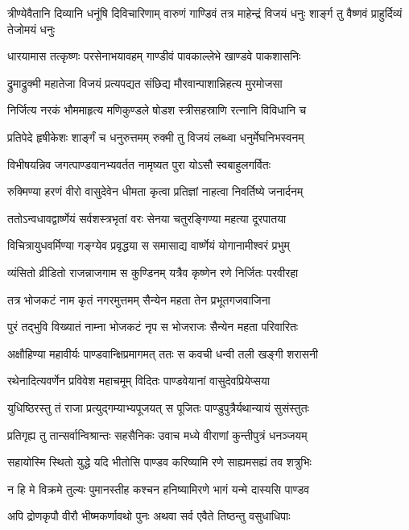 \threelineshloka
{त्रीण्येवैतानि दिव्यानि धनूंषि दिविचारिणाम्}
{वारुणं गाण्डिवं तत्र माहेन्द्रं विजयं धनुः}
{शार्ङ्ग तु वैष्णवं प्राहुर्दिव्यं तेजोमयं धनुः}


\twolineshloka
{धारयामास तत्कृष्णः परसेनाभयावहम्}
{गाण्डीवं पावकाल्लेभे खाण्डवे पाकशासनिः}


\twolineshloka
{द्रुमाद्रुक्मी महातेजा विजयं प्रत्यपद्यत}
{संछिद्य मौरवान्पाशान्निहत्य मुरमोजसा}


\twolineshloka
{निर्जित्य नरकं भौममाहृत्य मणिकुण्डले}
{षोडश स्त्रीसहस्राणि रत्नानि विविधानि च}


\twolineshloka
{प्रतिपेदे हृषीकेशः शार्ङ्गं च धनुरुत्तमम्}
{रुक्मी तु विजयं लब्ध्वा धनुर्मेघनिभस्वनम्}


\twolineshloka
{विभीषयन्निव जगत्पाण्डवानभ्यवर्तत}
{नामृष्यत पुरा योऽसौ स्वबाहुलगर्वितः}


\twolineshloka
{रुक्मिण्या हरणं वीरो वासुदेवेन धीमता}
{कृत्वा प्रतिज्ञां नाहत्वा निवर्तिष्ये जनार्दनम्}


\twolineshloka
{ततोऽन्वधावद्वार्ष्णेयं सर्वशस्त्रभृतां वरः}
{सेनया चतुरङ्गिण्या महत्या दूरपातया}


\twolineshloka
{विचित्रायुधवर्मिण्या गङ्ग्येव प्रवृद्धया}
{स समासाद्य वार्ष्णेयं योगानामीश्वरं प्रभुम्}


\twolineshloka
{व्यंसितो व्रीडितो राजन्नाजगाम स कुण्डिनम्}
{यत्रैव कृष्णेन रणे निर्जितः परवीरहा}


\twolineshloka
{तत्र भोजकटं नाम कृतं नगरमुत्तमम्}
{सैन्येन महता तेन प्रभूतगजवाजिना}


\twolineshloka
{पुरं तद्भुवि विख्यातं नाम्ना भोजकटं नृप}
{स भोजराजः सैन्येन महता परिवारितः}


\twolineshloka
{अक्षौहिण्या महावीर्यः पाण्डवान्क्षिप्रमागमत्}
{ततः स कवची धन्वी तली खङ्गी शरासनी}


\twolineshloka
{रथेनादित्यवर्णेन प्रविवेश महाचमूम्}
{विदितः पाण्डवेयानां वासुदेवप्रियेप्सया}


\twolineshloka
{युधिष्ठिरस्तु तं राजा प्रत्युद्गम्याभ्यपूजयत्}
{स पूजितः पाण्डुपुत्रैर्यथान्यायं सुसंस्तुतः}


\twolineshloka
{प्रतिगृह्य तु तान्सर्वान्विश्रान्तः सहसैनिकः}
{उवाच मध्ये वीराणां कुन्तीपुत्रं धनञ्जयम्}


\twolineshloka
{सहायोस्मि स्थितो युद्धे यदि भीतोसि पाण्डव}
{करिष्यामि रणे साह्यमसह्यं तव शत्रुभिः}


\twolineshloka
{न हि मे विक्रमे तुल्यः पुमानस्तीह कश्चन}
{हनिष्यामिरणे भागं यन्मे दास्यसि पाण्डव}


\twolineshloka
{अपि द्रोणकृपौ वीरौ भीष्मकर्णावथो पुनः}
{अथवा सर्व एवैते तिष्ठन्तु वसुधाधिपाः}


